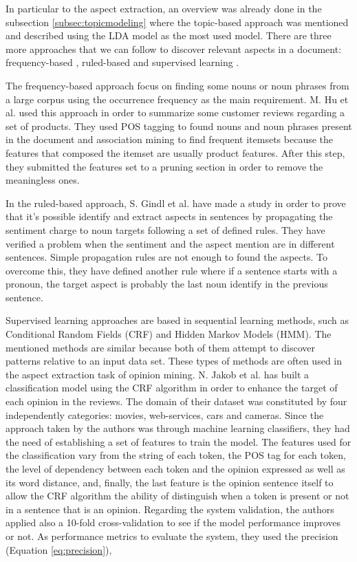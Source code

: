 In particular to the aspect extraction, an overview was already done in the subsection \ref{subsec:topicmodeling} where the topic-based approach was mentioned and described using the LDA model as the most used model. There are three more approaches that we can follow to discover relevant aspects in a document: frequency-based \cite{kn:hu2004}, ruled-based \cite{kn:Gindl2013} and supervised learning \cite{kn:Jakob, kn:Jin2009}.

The frequency-based approach focus on finding some nouns or noun phrases from a large corpus using the occurrence frequency as the main requirement. M. Hu et al. \cite{kn:hu2004} used this approach in order to summarize some customer reviews regarding a set of products. They used POS tagging to found nouns and noun phrases present in the document and association mining to find frequent itemsets because the features that composed the itemset are usually product features. After this step, they submitted the features set to a pruning section in order to remove the meaningless ones.

In the ruled-based approach, S. Gindl et al. \cite{kn:Gindl2013} have made a study in order to prove that it's possible identify and extract aspects in sentences by propagating the sentiment charge to noun targets following a set of defined rules. They have verified a problem when the sentiment and the aspect mention are in different sentences. Simple propagation rules are not enough to found the aspects. To overcome this, they have defined another rule where if a sentence starts with a pronoun, the target aspect is probably the last noun identify in the previous sentence.

Supervised learning approaches are based in sequential learning methods, such as Conditional Random Fields (CRF) and Hidden Markov Models (HMM). The mentioned methods are similar because both of them attempt to discover patterns relative to an input data set. These types of methods are often used in the aspect extraction task of opinion mining. N. Jakob et al. \cite{kn:Jakob} has built a classification model using the CRF algorithm in order to enhance the target of each opinion in the reviews. The domain of their dataset was constituted by four independently categories: movies, web-services, cars and cameras. Since the approach taken by the authors was through machine learning classifiers, they had the need of establishing a set of features to train the model. The features used for the classification vary from the string of each token, the POS tag for each token, the level of dependency between each token and the opinion expressed as well as its word distance, and, finally, the last feature is the opinion sentence itself to allow the CRF algorithm the ability of distinguish when a token is present or not in a sentence that is an opinion. Regarding the system validation, the authors applied also a 10-fold cross-validation to see if the model performance improves or not. As performance metrics to evaluate the system, they used the precision (Equation \ref{eq:precision}),

